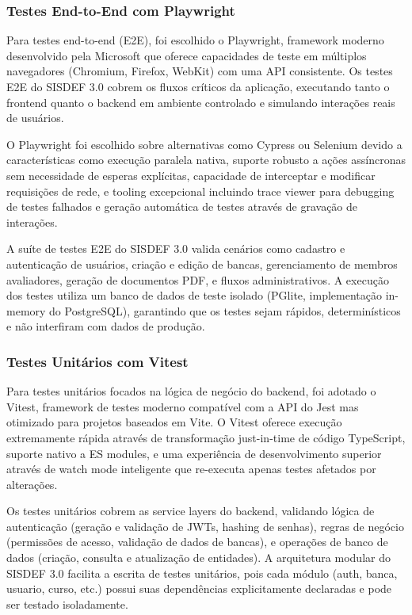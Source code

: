 \documentclass[nonacm, sigconf]{acmart}
\begin{document}
\subsubsection{Testes End-to-End com Playwright}

Para testes end-to-end (E2E), foi escolhido o Playwright, framework moderno desenvolvido pela Microsoft que oferece capacidades de teste em múltiplos navegadores (Chromium, Firefox, WebKit) com uma API consistente. Os testes E2E do SISDEF 3.0 cobrem os fluxos críticos da aplicação, executando tanto o frontend quanto o backend em ambiente controlado e simulando interações reais de usuários.

O Playwright foi escolhido sobre alternativas como Cypress ou Selenium devido a características como execução paralela nativa, suporte robusto a ações assíncronas sem necessidade de esperas explícitas, capacidade de interceptar e modificar requisições de rede, e tooling excepcional incluindo trace viewer para debugging de testes falhados e geração automática de testes através de gravação de interações.

A suíte de testes E2E do SISDEF 3.0 valida cenários como cadastro e autenticação de usuários, criação e edição de bancas, gerenciamento de membros avaliadores, geração de documentos PDF, e fluxos administrativos. A execução dos testes utiliza um banco de dados de teste isolado (PGlite, implementação in-memory do PostgreSQL), garantindo que os testes sejam rápidos, determinísticos e não interfiram com dados de produção.

\subsubsection{Testes Unitários com Vitest}

Para testes unitários focados na lógica de negócio do backend, foi adotado o Vitest, framework de testes moderno compatível com a API do Jest mas otimizado para projetos baseados em Vite. O Vitest oferece execução extremamente rápida através de transformação just-in-time de código TypeScript, suporte nativo a ES modules, e uma experiência de desenvolvimento superior através de watch mode inteligente que re-executa apenas testes afetados por alterações.

Os testes unitários cobrem as service layers do backend, validando lógica de autenticação (geração e validação de JWTs, hashing de senhas), regras de negócio (permissões de acesso, validação de dados de bancas), e operações de banco de dados (criação, consulta e atualização de entidades). A arquitetura modular do SISDEF 3.0 facilita a escrita de testes unitários, pois cada módulo (auth, banca, usuario, curso, etc.) possui suas dependências explicitamente declaradas e pode ser testado isoladamente.
\end{document}
